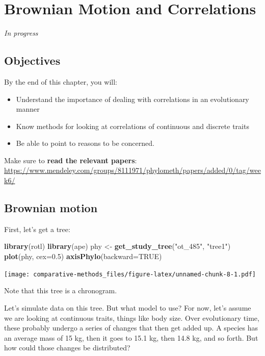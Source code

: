 \documentclass[]{book}
\newenvironment{Shaded}{\begin{snugshade}}{\end{snugshade}}
\newcommand{\KeywordTok}[1]{\textcolor[rgb]{0.13,0.29,0.53}{\textbf{{#1}}}}
\newcommand{\DataTypeTok}[1]{\textcolor[rgb]{0.13,0.29,0.53}{{#1}}}
\newcommand{\FloatTok}[1]{\textcolor[rgb]{0.00,0.00,0.81}{{#1}}}
\newcommand{\StringTok}[1]{\textcolor[rgb]{0.31,0.60,0.02}{{#1}}}
\newcommand{\OtherTok}[1]{\textcolor[rgb]{0.56,0.35,0.01}{{#1}}}
\newcommand{\NormalTok}[1]{{#1}}
\providecommand{\tightlist}{%
  \setlength{\itemsep}{0pt}\setlength{\parskip}{0pt}}
\theoremstyle{definition}
\theoremstyle{definition}
\theoremstyle{remark}
\begin{document}
\chapter{Brownian Motion and
Correlations}\label{brownian-motion-and-correlations}

\emph{In progress}

\section{Objectives}\label{objectives-1}

By the end of this chapter, you will:

\begin{itemize}
\tightlist
\item
  Understand the importance of dealing with correlations in an
  evolutionary manner
\item
  Know methods for looking at correlations of continuous and discrete
  traits
\item
  Be able to point to reasons to be concerned.
\end{itemize}

Make sure to \textbf{read the relevant papers}:
\url{https://www.mendeley.com/groups/8111971/phylometh/papers/added/0/tag/week6/}

\section{Brownian motion}\label{brownian-motion}

First, let's get a tree:

\begin{Shaded}
\begin{Highlighting}[]
\KeywordTok{library}\NormalTok{(rotl)}
\KeywordTok{library}\NormalTok{(ape)}
\NormalTok{phy <-}\StringTok{ }\KeywordTok{get_study_tree}\NormalTok{(}\StringTok{"ot_485"}\NormalTok{, }\StringTok{"tree1"}\NormalTok{)}
\KeywordTok{plot}\NormalTok{(phy, }\DataTypeTok{cex=}\FloatTok{0.5}\NormalTok{)}
\KeywordTok{axisPhylo}\NormalTok{(}\DataTypeTok{backward=}\OtherTok{TRUE}\NormalTok{)}
\end{Highlighting}
\end{Shaded}

\texttt{[image: comparative-methods\_files/figure-latex/unnamed-chunk-8-1.pdf]}

Note that this tree is a chronogram.

Let's simulate data on this tree. But what model to use? For now, let's
assume we are looking at continuous traits, things like body size. Over
evolutionary time, these probably undergo a series of changes that then
get added up. A species has an average mass of 15 kg, then it goes to
15.1 kg, then 14.8 kg, and so forth. But how could those changes be
distributed?
\end{document}
